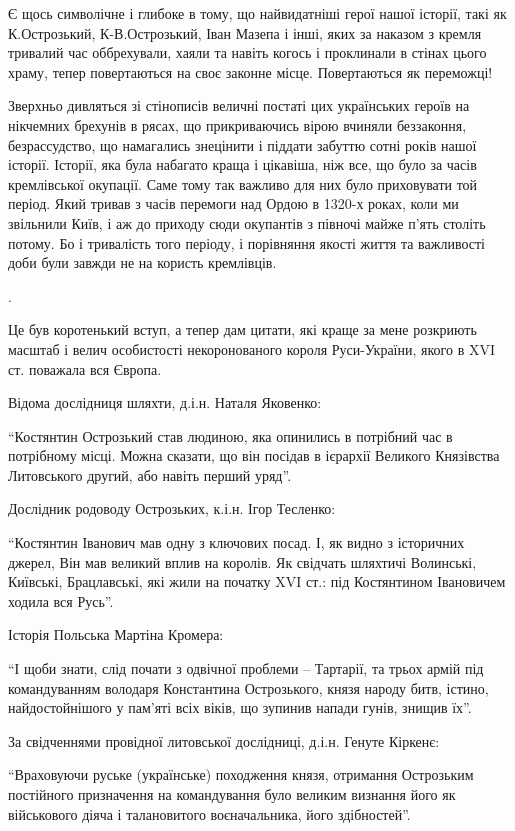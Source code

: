 Є щось символічне і глибоке в тому, що найвидатніші герої нашої історії, такі
як К.Острозький, К-В.Острозький, Іван Мазепа і інші, яких за наказом з кремля
тривалий час оббрехували, хаяли та навіть когось і проклинали в стінах цього
храму, тепер повертаються на своє законне місце. Повертаються як переможці!

Зверхньо дивляться зі стінописів величні постаті цих українських героїв на
нікчемних брехунів в рясах, що прикриваючись вірою вчиняли беззаконня,
безрассудство, що намагались знецінити і піддати забуттю сотні років нашої
історії. Історії, яка була набагато краща і цікавіша, ніж все, що було за часів
кремлівської окупації. Саме тому так важливо для них було приховувати той
період. Який тривав з часів перемоги над Ордою в 1320-х роках, коли ми
звільнили Київ, і аж до приходу сюди окупантів з півночі майже п’ять століть
потому. Бо і тривалість того періоду, і порівняння якості життя та важливості
доби були завжди не на користь кремлівців.

.

Це був коротенький вступ, а тепер дам цитати, які краще за мене розкриють
масштаб і велич особистості некоронованого короля Руси-України, якого в XVI ст.
поважала вся Європа.

Відома дослідниця шляхти, д.і.н. Наталя Яковенко:

\enquote{Костянтин Острозький став людиною, яка опинились в потрібний час в потрібному
місці. Можна сказати, що він посідав в ієрархії Великого Князівства Литовського
другий, або навіть перший уряд}.

Дослідник родоводу Острозьких, к.і.н. Ігор Тесленко:

\enquote{Костянтин Іванович мав одну з ключових посад. І, як видно з історичних джерел,
Він мав великий вплив на королів. Як свідчать шляхтичі Волинські, Київські,
Брацлавські, які жили на початку XVI ст.: під Костянтином Івановичем ходила вся
Русь}.

Історія Польська Мартіна Кромера:

\enquote{І щоби знати, слід почати з одвічної проблеми – Тартарії, та трьох армій під
командуванням володаря Константина Острозького, князя народу битв, істино,
найдостойнішого у пам’яті всіх віків, що зупинив напади гунів, знищив їх}.

За свідченнями провідної литовської дослідниці, д.і.н. Генуте Кіркенє: 

\enquote{Враховуючи руське (українське) походження князя, отримання Острозьким
постійного призначення на командування було великим визнання його як
військового діяча і талановитого воєначальника, його здібностей}.

